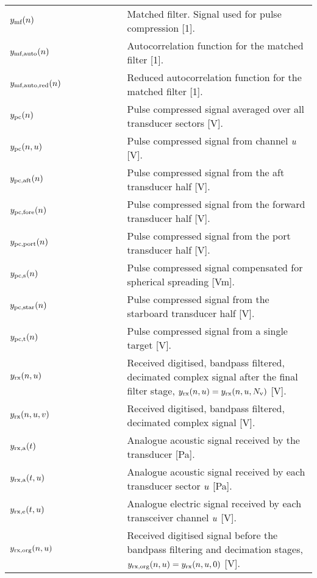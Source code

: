 \documentclass[12pt,a4paper]{article}
\begin{document}
\begin{longtable}{p{0.15\linewidth} p{0.2\linewidth} p{0.65\linewidth} }
$y_{\textrm{mf}}(n)$ & & Matched filter. Signal used for pulse compression [1].\\
$y_{\textrm{mf,auto}}(n)$ & & Autocorrelation function for the matched filter [1].\\
$y_{\textrm{mf,auto,red}}(n)$ & & Reduced autocorrelation function for the matched filter [1].\\

$y_{\textrm{pc}}(n)$ & & Pulse compressed signal averaged over all transducer sectors [V].\\
$y_{\textrm{pc}}(n, u) $ & & Pulse compressed signal from channel $u$ [V].\\
$y_{\textrm{pc,aft}}(n)$ & & Pulse compressed signal from the aft transducer half [V].\\
$y_{\textrm{pc,fore}}(n)$ & & Pulse compressed signal from the forward transducer half [V].\\
$y_{\textrm{pc,port}}(n)$ & & Pulse compressed signal from the port transducer half [V].\\
$y_{\textrm{pc,s}}(n)$ & & Pulse compressed signal compensated for spherical spreading [Vm].\\
$y_{\textrm{pc,star}}(n)$ & & Pulse compressed signal from the starboard transducer half [V].\\
$y_{\textrm{pc,t}}(n)$ & & Pulse compressed signal from a single target [V].\\

$y_{\textrm{rx}}(n,u)$ & & Received digitised, bandpass filtered, decimated complex signal after the final filter stage, $y_{\textrm{rx}}(n,u) = y_{\textrm{rx}}(n,u,N_{\textrm{v}})$ [V].\\
$y_{\textrm{rx}}(n,u,v)$ & & Received digitised, bandpass filtered, decimated complex signal [V].\\
$y_{\textrm{rx,a}}(t)$ & & Analogue acoustic signal received by the transducer [Pa].\\
$y_{\textrm{rx,a}}(t,u)$ & & Analogue acoustic signal received by each transducer sector $u$ [Pa].\\
$y_{\textrm{rx,e}}(t,u)$ & & Analogue electric signal received by each transceiver channel $u$ [V].\\

$y_{\textrm{rx,org}}(n,u)$ & & Received digitised signal before the bandpass filtering and decimation stages, $y_{\textrm{rx,org}}(n,u) = y_{\textrm{rx}}(n,u,0)$ [V].\\


\end{longtable}
\end{document}
